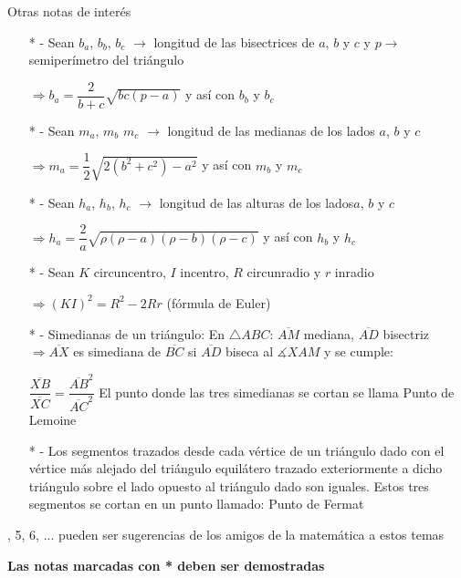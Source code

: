 \vspace{0.5cm}
\noindent Otras notas de interés
\begin{itemize}
    \item[* -] Sean $b_a$, $b_b$, $b_c$ $\rightarrow$ longitud de las bisectrices de $a$, $b$ y $c$ y $p \rightarrow$ semiperímetro del triángulo
    \item[] $\Longrightarrow b_a=\dfrac{2}{b+c}\sqrt{bc(p-a)}$ y así con $b_b$ y $b_c$
    \item[* -] Sean $m_a$, $m_b$ $m_c$ $\rightarrow$ longitud de las medianas de los lados $a$, $b$ y $c$
    \item[]$\Longrightarrow m_a = \dfrac{1}{2}\sqrt{2(b^2 + c^2)- a^2}$ y así con $m_b$ y $m_c$
    \item[* -] Sean $h_a$, $h_b$, $h_c$ $\rightarrow$ longitud de las alturas de los lados$a$, $b$ y $c$
    \item[] $\Longrightarrow h_a = \dfrac{2}{a}\sqrt{\rho(\rho-a)(\rho-b)(\rho-c)}$ y así con $h_b$ y $h_c$
    \item[* -] Sean $K$ circuncentro, $I$ incentro, $R$ circunradio y $r$ inradio
    \item[] $\Longrightarrow (KI)^2 = R^2 - 2Rr$ (fórmula de Euler)
    \item[* -] Simedianas de un triángulo: En $\triangle ABC$: $\overline{AM}$ mediana, $\overline{AD}$ bisectriz $\Longrightarrow \overline{AX}$ es simediana de $\overline{BC}$ si $\overline{AD}$ biseca al $\measuredangle XAM$ y se cumple:
    \item[] $\dfrac{\overline{XB}}{\overline{XC}}=\dfrac{\overline{AB}^2}{\overline{AC}^2}$ El punto donde las tres simedianas se cortan se llama Punto de Lemoine
    \item[* -] Los segmentos trazados desde cada vértice de un triángulo dado con el vértice más alejado del triángulo equilátero trazado exteriormente a dicho triángulo sobre el lado opuesto al triángulo dado son iguales. Estos tres segmentos se cortan en un punto llamado: Punto de Fermat 
\end{itemize}


\vspace{0.5cm}
, 5, 6, ... pueden ser sugerencias de los amigos de la matemática a estos temas

\vspace{0.5cm}
\begin{center}
    \textbf{Las notas marcadas con * deben ser demostradas}
\end{center}

